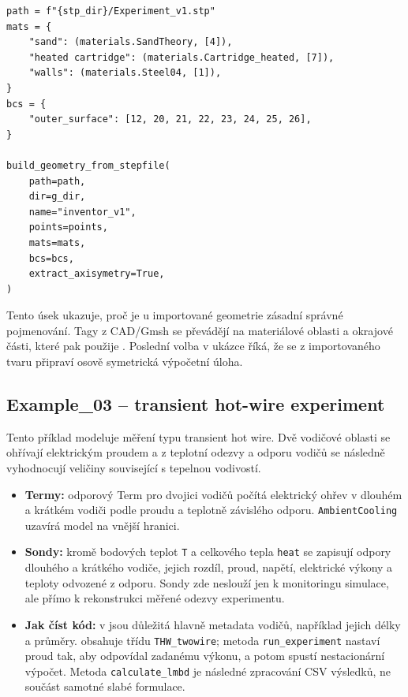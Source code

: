 \documentclass[a4paper,11pt]{article}
\begin{document}
\begin{lstlisting}[style=py]
path = f"{stp_dir}/Experiment_v1.stp"
mats = {
    "sand": (materials.SandTheory, [4]),
    "heated cartridge": (materials.Cartridge_heated, [7]),
    "walls": (materials.Steel04, [1]),
}
bcs = {
    "outer_surface": [12, 20, 21, 22, 23, 24, 25, 26],
}

build_geometry_from_stepfile(
    path=path,
    dir=g_dir,
    name="inventor_v1",
    points=points,
    mats=mats,
    bcs=bcs,
    extract_axisymetry=True,
)
\end{lstlisting}

Tento úsek ukazuje, proč je u importované geometrie zásadní správné pojmenování.
Tagy z CAD/Gmsh se převádějí na materiálové oblasti a okrajové části, které pak
použije . Poslední volba v ukázce říká, že se z importovaného
tvaru připraví osově symetrická výpočetní úloha.

\subsection*{Example\_03 -- transient hot-wire experiment}

Tento příklad modeluje měření typu transient hot wire. Dvě vodičové oblasti se
ohřívají elektrickým proudem a z teplotní odezvy a odporu vodičů se následně
vyhodnocují veličiny související s tepelnou vodivostí.

\begin{itemize}
  \item \textbf{Termy:} odporový Term pro dvojici vodičů počítá elektrický ohřev
        v dlouhém a krátkém vodiči podle proudu a teplotně závislého odporu.
        \texttt{AmbientCooling} uzavírá model na vnější hranici.
  \item \textbf{Sondy:} kromě bodových teplot \texttt{T} a celkového tepla
        \texttt{heat} se zapisují odpory dlouhého a krátkého vodiče, jejich
        rozdíl, proud, napětí, elektrické výkony a teploty odvozené z odporu.
        Sondy zde neslouží jen k monitoringu simulace, ale přímo k rekonstrukci
        měřené odezvy experimentu.
  \item \textbf{Jak číst kód:} v  jsou důležitá hlavně
        metadata vodičů, například jejich délky a průměry. 
        obsahuje třídu \texttt{THW\_twowire}; metoda
        \texttt{run\_experiment} nastaví proud tak, aby odpovídal zadanému
        výkonu, a potom spustí nestacionární výpočet. Metoda
        \texttt{calculate\_lmbd} je následné zpracování CSV výsledků, ne součást
        samotné slabé formulace.
\end{itemize}
\end{document}
